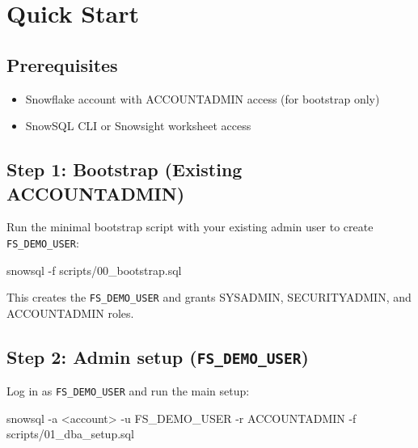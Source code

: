 \documentclass[
  letterpaper,
  DIV=11,
  numbers=noendperiod]{scrreprt}
\newenvironment{Shaded}{\begin{snugshade}}{\end{snugshade}}
\newcommand{\AttributeTok}[1]{\textcolor[rgb]{0.40,0.45,0.13}{#1}}
\newcommand{\ExtensionTok}[1]{\textcolor[rgb]{0.00,0.23,0.31}{#1}}
\newcommand{\NormalTok}[1]{\textcolor[rgb]{0.00,0.23,0.31}{#1}}
\newcommand{\OperatorTok}[1]{\textcolor[rgb]{0.37,0.37,0.37}{#1}}
\providecommand{\tightlist}{%
  \setlength{\itemsep}{0pt}\setlength{\parskip}{0pt}}\usepackage{longtable,booktabs,array}
\begin{document}
\hypertarget{quick-start-4}{%
\section{Quick Start}\label{quick-start-4}}

\hypertarget{prerequisites-3}{%
\subsection{Prerequisites}\label{prerequisites-3}}

\begin{itemize}
\tightlist
\item
  Snowflake account with ACCOUNTADMIN access (for bootstrap only)
\item
  SnowSQL CLI or Snowsight worksheet access
\end{itemize}

\hypertarget{step-1-bootstrap-existing-accountadmin}{%
\subsection{Step 1: Bootstrap (Existing
ACCOUNTADMIN)}\label{step-1-bootstrap-existing-accountadmin}}

Run the minimal bootstrap script with your existing admin user to create
\texttt{FS\_DEMO\_USER}:

\begin{Shaded}
\begin{Highlighting}[]
\ExtensionTok{snowsql} \AttributeTok{{-}f}\NormalTok{ scripts/00\_bootstrap.sql}
\end{Highlighting}
\end{Shaded}

This creates the \texttt{FS\_DEMO\_USER} and grants SYSADMIN,
SECURITYADMIN, and ACCOUNTADMIN roles.

\hypertarget{step-2-admin-setup-fs_demo_user}{%
\subsection{\texorpdfstring{Step 2: Admin setup
(\texttt{FS\_DEMO\_USER})}{Step 2: Admin setup (FS\_DEMO\_USER)}}\label{step-2-admin-setup-fs_demo_user}}

Log in as \texttt{FS\_DEMO\_USER} and run the main setup:

\begin{Shaded}
\begin{Highlighting}[]
\ExtensionTok{snowsql} \AttributeTok{{-}a} \OperatorTok{\textless{}}\NormalTok{account}\OperatorTok{\textgreater{}}\NormalTok{ {-}u FS\_DEMO\_USER }\AttributeTok{{-}r}\NormalTok{ ACCOUNTADMIN }\AttributeTok{{-}f}\NormalTok{ scripts/01\_dba\_setup.sql}
\end{Highlighting}
\end{Shaded}
\end{document}
